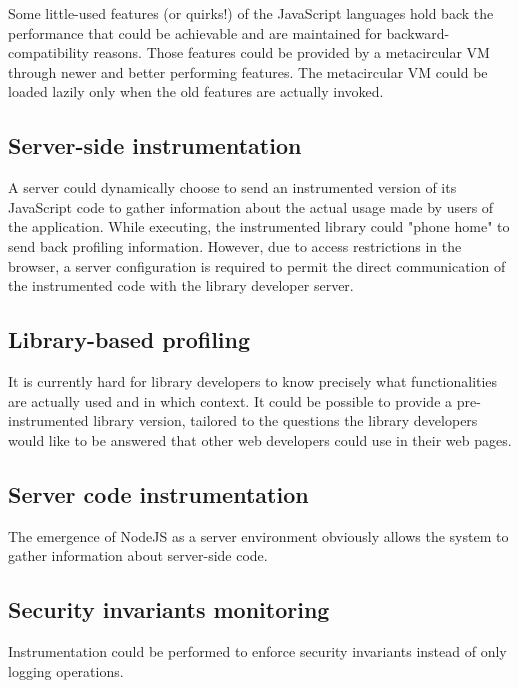 Some little-used features (or quirks!) of the JavaScript languages hold back
the performance that could be achievable and are maintained for
backward-compatibility reasons. Those features could be provided by a
metacircular VM through newer and better performing features.  The
metacircular VM could be loaded lazily only when the old features are actually
invoked.

\subsection{Server-side instrumentation}

A server could dynamically choose to send an instrumented version of its
JavaScript code to gather information about the actual usage made by users of
the application. While executing, the instrumented library could "phone home"
to send back profiling information. However, due to access restrictions in the
browser, a server configuration is required to permit the direct communication
of the instrumented code with the library developer server.

\subsection{Library-based profiling}

It is currently hard for library developers to know precisely what
functionalities are actually used and in which context. It could be possible to
provide a pre-instrumented library version, tailored to the questions the
library developers would like to be answered that other web developers could
use in their web pages. 

\subsection{Server code instrumentation}

The emergence of NodeJS as a server environment obviously allows the system to
gather information about server-side code.

\subsection{Security invariants monitoring}

Instrumentation could be performed to enforce security invariants instead of
only logging operations. 
